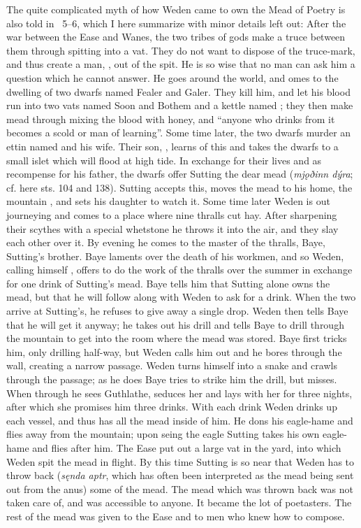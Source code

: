 The quite complicated myth of how Weden came to own the Mead of Poetry is also told in \Skaldskaparmal\ 5–6, which I here summarize with minor details left out: After the war between the Ease and Wanes, the two tribes of gods make a truce between them through spitting into a vat. They do not want to dispose of the truce-mark, and thus create a man, , out of the spit. He is so wise that no man can ask him a question which he cannot answer. He goes around the world, and omes to the dwelling of two dwarfs named Fealer and Galer. They kill him, and let his blood run into two vats named Soon and Bothem and a kettle named ; they then make mead through mixing the blood with honey, and “anyone who drinks from it becomes a scold or man of learning”.
Some time later, the two dwarfs murder an ettin named  and his wife. Their son, , learns of this and takes the dwarfs to a small islet which will flood at high tide. In exchange for their lives and as recompense for his father, the dwarfs offer Sutting the dear mead (\emph{mjǫðinn dýra}; cf. here sts. 104 and 138). Sutting accepts this, moves the mead to his home, the mountain , and sets his daughter  to watch it.
Some time later Weden is out journeying and comes to a place where nine thralls cut hay. After sharpening their scythes with a special whetstone he throws it into the air, and they slay each other over it. By evening he comes to the master of the thralls, Baye, Sutting’s brother. Baye laments over the death of his workmen, and so Weden, calling himself , offers to do the work of the thralls over the summer in exchange for one drink of Sutting’s mead. Baye tells him that Sutting alone owns the mead, but that he will follow along with Weden to ask for a drink.
When the two arrive at Sutting’s, he refuses to give away a single drop. Weden then tells Baye that he will get it anyway; he takes out his drill  and tells Baye to drill through the mountain to get into the room where the mead was stored. Baye first tricks him, only drilling half-way, but Weden calls him out and he bores through the wall, creating a narrow passage. Weden turns himself into a snake and crawls through the passage; as he does Baye tries to strike him the drill, but misses.
When through he sees Guthlathe, seduces her and lays with her for three nights, after which she promises him three drinks. With each drink Weden drinks up each vessel, and thus has all the mead inside of him.
He dons his eagle-hame and flies away from the mountain; upon seing the eagle Sutting takes his own eagle-hame and flies after him. The Ease put out a large vat in the yard, into which Weden spit the mead in flight. By this time Sutting is so near that Weden has to throw back (\emph{sęnda aptr}, which has often been interpreted as the mead being sent out from the anus) some of the mead.
The mead which was thrown back was not taken care of, and was accessible to anyone. It became the lot of poetasters. The rest of the mead was given to the Ease and to men who knew how to compose.

